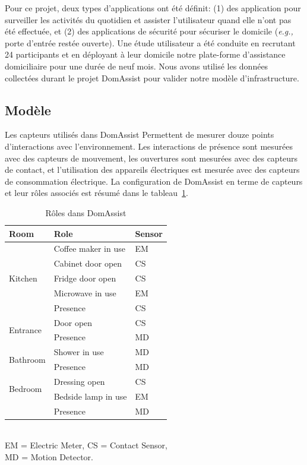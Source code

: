 Pour ce projet, deux types d'applications ont été définit: (1) des application pour surveiller les activités du quotidien et assister l'utilisateur quand elle n'ont pas été effectuée, et (2) des applications de sécurité pour sécuriser le domicile ({\em e.g.,} porte d'entrée restée ouverte). Une étude utilisateur a été conduite en recrutant 24 participants et en déployant à leur domicile notre plate-forme d'assistance domiciliaire pour une durée de neuf mois. Nous avons utilisé les données collectées durant le projet DomAssist pour valider notre modèle d'infrastructure.

\subsection{Modèle}\label{validation:model} 

Les capteurs utilisés dans DomAssist Permettent de mesurer douze points d'interactions avec l'environnement. Les interactions de présence sont mesurées avec des capteurs de mouvement, les ouvertures sont mesurées avec des capteurs de contact, et l'utilisation des appareils électriques est mesurée avec des capteurs de consommation électrique. La configuration de DomAssist en terme de capteurs et leur rôles associés est résumé dans le tableau~\ref{tab:domassist:role}.

\begin{table}[h!]
  \centering
  \begin{tabular}{|l|l|l|}
    \hline
    Room & Role & Sensor \\
    \hline
    \multirow{5}{*}{Kitchen} & Coffee maker in use & EM \\
    & Cabinet door open & CS \\
    & Fridge door open & CS \\
    & Microwave in use & EM \\
    & Presence & CS \\
    \hline
    \multirow{2}{*}{Entrance} & Door open & CS \\
    & Presence & MD \\
    \hline
    \multirow{2}{*}{Bathroom} & Shower in use & MD \\
    & Presence & MD \\
    \hline
    \multirow{2}{*}{Bedroom} & Dressing open & CS \\
    & Bedside lamp in use & EM \\
    & Presence & MD\\
    \hline
  \end{tabular}
\ \\ EM = Electric Meter, CS = Contact Sensor,\\ MD = Motion Detector.
  \caption{Rôles dans DomAssist}
  \label{tab:domassist:role}
\end{table}

